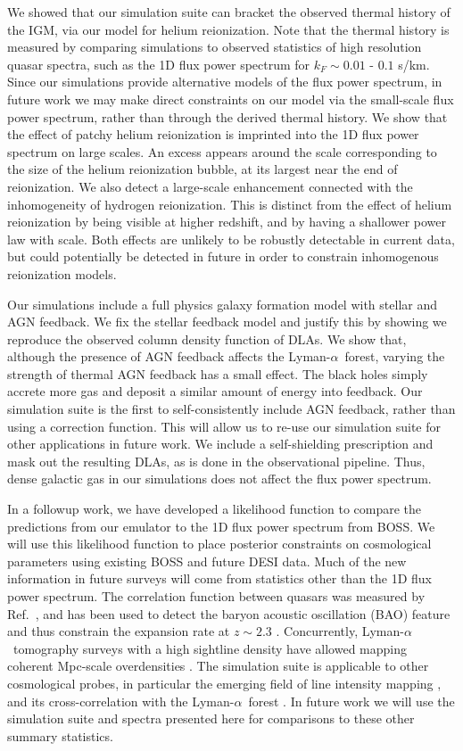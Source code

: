 \documentclass[a4paper,11pt]{article}
\newcommand{\Lya}{Lyman-$\alpha$}
\begin{document}
We showed that our simulation suite can bracket the observed thermal history of the IGM, via our model for helium reionization. Note that the thermal history is measured by comparing simulations to observed statistics of high resolution quasar spectra, such as the 1D flux power spectrum for $ k_F \sim 0.01$ - $0.1$ s/km. Since our simulations provide alternative models of the flux power spectrum, in future work we may make direct constraints on our model via the small-scale flux power spectrum, rather than through the derived thermal history. We show that the effect of patchy helium reionization is imprinted into the 1D flux power spectrum on large scales. An excess appears around the scale corresponding to the size of the helium reionization bubble, at its largest near the end of reionization. We also detect a large-scale enhancement connected with the inhomogeneity of hydrogen reionization. This is distinct from the effect of helium reionization by being visible at higher redshift, and by having a shallower power law with scale. Both effects are unlikely to be robustly detectable in current data, but could potentially be detected in future in order to constrain inhomogenous reionization models.

Our simulations include a full physics galaxy formation model with stellar and AGN feedback. We fix the stellar feedback model and justify this by showing we reproduce the observed column density function of DLAs. We show that, although the presence of AGN feedback affects the
\Lya~forest, varying the strength of thermal AGN feedback has a small effect. The black holes simply accrete more gas and deposit a similar amount of energy into feedback. Our simulation suite is the first to self-consistently include AGN feedback, rather than using a correction function. This will allow us to re-use our simulation suite for other applications in future work. We include a self-shielding prescription and mask out the resulting DLAs, as is done in the observational pipeline. Thus, dense galactic gas in our simulations does not affect the flux power spectrum.

In a followup work, we have developed a likelihood function to compare the predictions from our emulator to the 1D flux power spectrum from BOSS. We will use this likelihood function to place posterior constraints on cosmological parameters using existing BOSS and future DESI data. Much of the new information in future surveys will come from statistics other than the 1D flux power spectrum. The correlation function between quasars was measured by Ref.~\cite{Slosar:2011}, and has been used to detect the baryon acoustic oscillation (BAO) feature and thus constrain the expansion rate at $z\sim 2.3$ \cite{dSAgathe:2019, Cuceu:2022}. Concurrently, \Lya~tomography surveys with a high sightline density have allowed mapping coherent Mpc-scale overdensities \cite{Lee:CLAMATO, LATIS, Qezlou:2022, Horowitz:2022}. The simulation suite is applicable to other cosmological probes, in particular the emerging field of line intensity mapping \cite{Kovetz:2017}, and its cross-correlation with the \Lya~forest \cite{Qezlou:2023}. In future work we will use the simulation suite and spectra presented here for comparisons to these other summary statistics.
\end{document}
